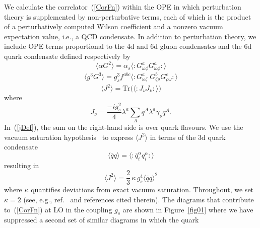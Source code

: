 \documentclass[11pt, letterpaper]{article}
\begin{document}
We calculate the correlator~(\ref{CorFn}) within the OPE
in which perturbation theory is supplemented by non-perturbative terms,
each of which is the product of a perturbatively computed Wilson coefficient 
and a nonzero vacuum expectation value, i.e., a QCD condensate.
In addition to perturbation theory, we include OPE terms proportional to the 4d and 6d gluon
condensates and the 6d quark condensate defined respectively by
%
\begin{equation} \label{fourDcond}
\big\langle \alpha G^{2} \big\rangle = \alpha_{s} \big\langle \! \colon \! G_{\omega\phi}^{a} G_{\omega\phi}^{a} \! \colon\! \big\rangle
\end{equation}
%
\begin{equation} \label{sixDcond}
\begin{aligned}
\big\langle g^{3}G^{3}\big\rangle = g_{s}^{3} f^{abc} \big\langle \! \colon \! G^{a}_{\omega\zeta} \; G^{b}_{\zeta\rho} G^{c}_{\rho\omega} \! \colon\! \big\rangle
\end{aligned}
\end{equation}
%
\begin{equation} \label{sixDQcondTr}
\big\langle J^2 \big\rangle =
\mathrm{Tr} \big(\big\langle \! \colon\! J_{\nu} J_{\nu} \! \colon\! \big\rangle \big)
\end{equation}
%
where
%
\begin{equation} \label{jDef}
J_{\nu} 
= \frac{-i g_s^2}{4} \lambda^a
\sum_{A} \overline{q}^A \lambda^a \gamma_{\nu} q^A. \end{equation}
%
In~(\ref{jDef}), the sum on the right-hand side is over quark flavours.
We use the vacuum saturation hypothesis~\cite{Shifman:1978bx} to express
$\langle J^2 \rangle$ in terms of the 3d quark condensate
%
\begin{equation} \label{threeDcond}
\big\langle \overline{q}q \big\rangle = \big\langle \! \colon \! \overline{q}^{\alpha}_{i} q^{\alpha}_{i} \! \colon\! \big\rangle
\end{equation}
%
resulting in
%
\begin{equation} \label{sixDQcond}
\big\langle J^2 \big\rangle
= \frac{2}{3} \, \kappa \, g_s^4 \big\langle \overline{q}q \big\rangle^2
\end{equation}
%
where $\kappa$ quantifies deviations from exact vacuum saturation. 
Throughout, we set $\kappa = 2$ (see, e.g., ref.~\cite{narisonbook:2004} and references cited therein).
The diagrams that contribute to~(\ref{CorFn}) at LO in the coupling
$g_s$ are shown 
in Figure~\ref{fig01} where we have suppressed a second set of similar diagrams in which the quark 
\end{document}
